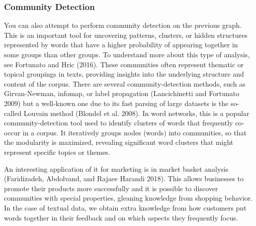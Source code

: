 \subsubsection{Community Detection}\label{community-detection}

You can also attempt to perform community detection on the previous
graph. This is an important tool for uncovering patterns, clusters, or
hidden structures represented by words that have a higher probability of
appearing together in some groups than other groups. To
understand more about this type of analysis, see Fortunato and Hric
(2016). These communities often represent thematic or topical groupings
in texts, providing insights into the underlying structure and content of
the corpus. There are several community-detection methods, such as
Girvan-Newman, infomap, or label propagation (Lancichinetti and
Fortunato 2009) but a well-known one due to its fast parsing of large
datasets is the so-called Louvain method (Blondel et al. 2008). In word
networks, this is a popular community-detection tool used
to identify clusters of words that frequently co-occur in a corpus.
It iteratively groups nodes (words) into communities, so that the
modularity is maximized, revealing significant word clusters that might
represent specific topics or themes.

An interesting application of it for marketing is in market basket analysis (Faridizadeh, Abdolvand, and Rajaee Harandi
2018). This allows businesses to promote their
products more successfully and it is possible to discover communities with special
properties, gleaning knowledge from shopping behavior. In the
case of textual data, we obtain extra knowledge from how customers put
words together in their feedback and on which aspects they frequently focus.

